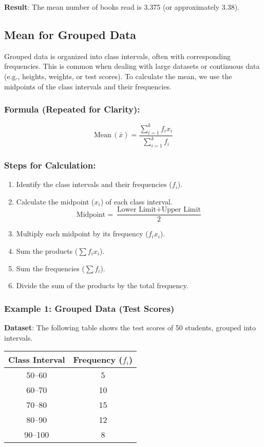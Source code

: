 \documentclass[11pt]{article}
\begin{document}
\textbf{Result}: The mean number of books read is 3.375 (or approximately 3.38).

\subsection{Mean for Grouped Data}

Grouped data is organized into class intervals, often with corresponding frequencies. This is common when dealing with large datasets or continuous data (e.g., heights, weights, or test scores). To calculate the mean, we use the midpoints of the class intervals and their frequencies.

\subsubsection*{Formula (Repeated for Clarity):}
\[
\text{Mean} \, (\bar{x}) = \frac{\sum_{i=1}^{k}f_i x_i}{\sum_{i=1}^{k}f_i}
\]

\subsubsection*{Steps for Calculation:}
\begin{enumerate}
    \item Identify the class intervals and their frequencies ($f_i$).
    \item Calculate the midpoint ($x_i$) of each class interval.
    \[
    \text{Midpoint} = \frac{\text{Lower Limit} + \text{Upper Limit}}{2}
    \]
    \item Multiply each midpoint by its frequency ($f_i x_i$).
    \item Sum the products ($\sum f_i x_i$).
    \item Sum the frequencies ($\sum f_i$).
    \item Divide the sum of the products by the total frequency.
\end{enumerate}

\subsubsection*{Example 1: Grouped Data (Test Scores)}
\textbf{Dataset}: The following table shows the test scores of 50 students, grouped into intervals.

\begin{center}
\begin{tabular}{|c|c|}
\hline
\textbf{Class Interval} & \textbf{Frequency} ($f_i$) \\
\hline
50--60 & 5 \\
60--70 & 10 \\
70--80 & 15 \\
80--90 & 12 \\
90--100 & 8 \\
\hline
\end{tabular}
\end{center}
\end{document}
